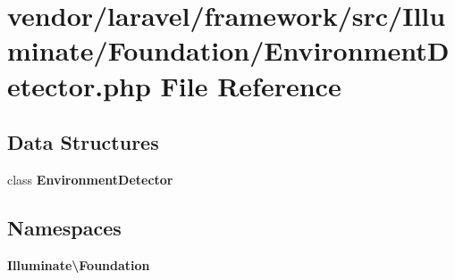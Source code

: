 \section{vendor/laravel/framework/src/\+Illuminate/\+Foundation/\+Environment\+Detector.php File Reference}
\label{_environment_detector_8php}
\subsection*{Data Structures}
\begin{DoxyCompactItemize}
\item 
class {\bf Environment\+Detector}
\end{DoxyCompactItemize}
\subsection*{Namespaces}
\begin{DoxyCompactItemize}
\item 
 {\bf Illuminate\textbackslash{}\+Foundation}
\end{DoxyCompactItemize}
